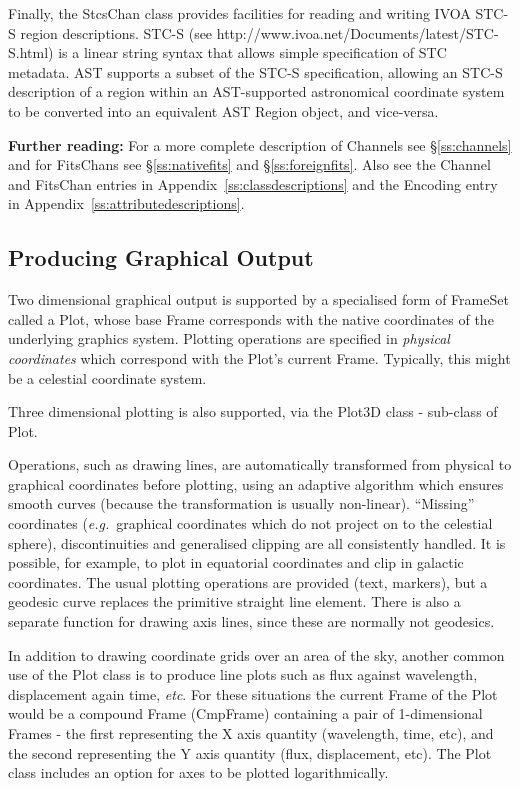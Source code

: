 \documentclass[twoside,11pt]{article}
\newcommand{\htmladdnormallink}[2]{#1}
\newcommand{\appref}[1]{Appendix~\ref{#1}}
\newcommand{\secref}[1]{\S\ref{#1}}
\newcommand{\appref}[1]{\ref{#1}}
\newcommand{\secref}[1]{\ref{#1}}
\begin{document}
Finally, the StcsChan class provides facilities for reading and writing
IVOA STC-S region descriptions. STC-S (see \htmladdnormallink{
http://www.ivoa.net/Documents/latest/STC-S.html}{
http://www.ivoa.net/Documents/latest/STC-S.html}) is a linear string
syntax that allows simple specification of STC metadata. AST supports a
subset of the STC-S specification, allowing an STC-S description of a
region within an AST-supported astronomical coordinate system to be converted
into an equivalent AST Region object, and vice-versa.

{\bf{Further reading:}} For a more complete description of Channels
see \secref{ss:channels} and for FitsChans see \secref{ss:nativefits}
and \secref{ss:foreignfits}. Also see the Channel and FitsChan entries
in \appref{ss:classdescriptions} and the Encoding entry in
\appref{ss:attributedescriptions}.

\subsection{Producing Graphical Output}

Two dimensional graphical output is supported by a specialised form of
FrameSet called
a Plot, whose base Frame corresponds with the native coordinates of
the underlying graphics system.  Plotting operations are specified in
{\em{physical coordinates}} which correspond with the Plot's current
Frame. Typically, this might be a celestial coordinate system.

Three dimensional plotting is also supported, via the Plot3D class -
sub-class of Plot.

Operations, such as drawing lines, are automatically transformed from
physical to graphical coordinates before plotting, using an adaptive
algorithm which ensures smooth curves (because the transformation is
usually non-linear).  ``Missing'' coordinates ({\em{e.g.}}\ graphical
coordinates which do not project on to the celestial sphere),
discontinuities and generalised clipping are all consistently handled.
It is possible, for example, to plot in equatorial coordinates and
clip in galactic coordinates.  The usual plotting operations are
provided (text, markers), but a geodesic curve replaces the primitive
straight line element.  There is also a separate function for drawing
axis lines, since these are normally not geodesics.

In addition to drawing coordinate grids over an area of the sky, another
common use of the Plot class is to produce line plots such as flux
against wavelength, displacement again time, \emph{etc}. For these
situations the current Frame of the Plot would be a compound Frame
(CmpFrame) containing a pair of 1-dimensional Frames - the first
representing the X axis quantity (wavelength, time, etc), and the second
representing the Y axis quantity (flux, displacement, etc). The Plot
class includes an option for axes to be plotted logarithmically.
\end{document}
